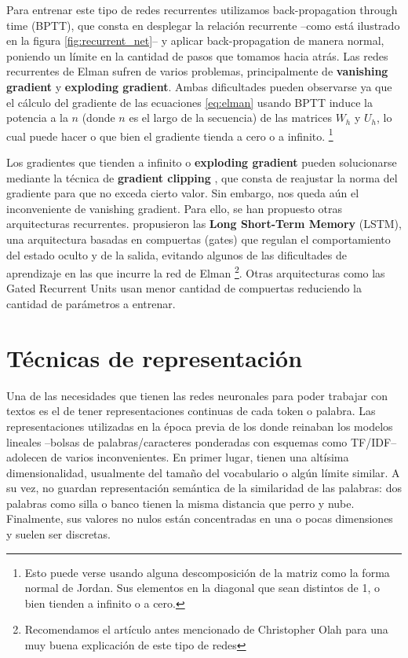 Para entrenar este tipo de redes recurrentes utilizamos back-propagation through time (BPTT), que consta en desplegar la relación recurrente --como está ilustrado en la figura \ref{fig:recurrent_net}-- y aplicar back-propagation de manera normal, poniendo un límite en la cantidad de pasos que tomamos hacia atrás. Las redes recurrentes de Elman sufren de varios problemas, principalmente de \textbf{vanishing gradient} y \textbf{exploding gradient}. Ambas dificultades pueden observarse ya que el cálculo del gradiente de las ecuaciones \ref{eq:elman} usando BPTT induce la potencia a la $n$ (donde $n$ es el largo de la secuencia) de las matrices $W_h$ y $U_h$, lo cual puede hacer o que bien el gradiente tienda a cero o a infinito. \footnote{ Esto puede verse usando alguna descomposición de la matriz como la forma normal de Jordan. Sus elementos en la diagonal que sean distintos de 1, o bien tienden a infinito o a cero.}

Los gradientes que tienden a infinito o \textbf{exploding gradient} pueden solucionarse mediante la técnica de \textbf{gradient clipping} \cite{goodfellow2016deep}, que consta de reajustar la norma del gradiente para que no exceda cierto valor. Sin embargo, nos queda aún el inconveniente de vanishing gradient. Para ello, se han propuesto otras arquitecturas recurrentes. \citet{hochreiter1997long} propusieron las \textbf{Long Short-Term Memory} (LSTM), una arquitectura basadas en compuertas (gates) que regulan el comportamiento del estado oculto y de la salida, evitando algunos de las dificultades de aprendizaje en las que incurre la red de Elman \footnote{Recomendamos el artículo antes mencionado de Christopher Olah para una muy buena explicación de este tipo de redes}. Otras arquitecturas como las Gated Recurrent Units \cite{cho-etal-2014-learning} usan menor cantidad de compuertas reduciendo la cantidad de parámetros a entrenar.

\section{Técnicas de representación}
\label{sec:02_representaciones}

Una de las necesidades que tienen las redes neuronales para poder trabajar con textos es el de tener representaciones continuas de cada token o palabra. Las representaciones utilizadas en la época previa de los donde reinaban los modelos lineales --bolsas de palabras/caracteres ponderadas con esquemas como TF/IDF-- adolecen de varios inconvenientes. En primer lugar, tienen una altísima dimensionalidad, usualmente del tamaño del vocabulario o algún límite similar. A su vez, no guardan representación semántica de la similaridad de las palabras: dos palabras como silla o banco tienen la misma distancia que perro y nube. Finalmente, sus valores no nulos están concentradas en una o pocas dimensiones y suelen ser discretas.

